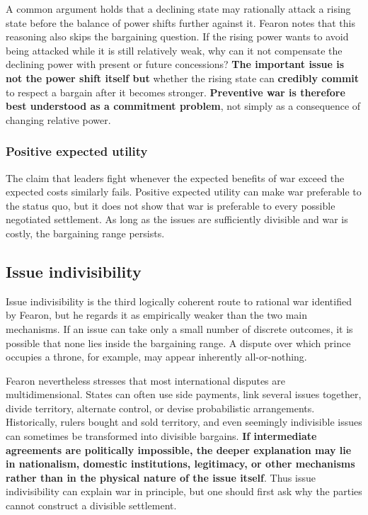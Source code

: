 A common argument holds that a declining state may rationally attack a rising state before the balance of power shifts further against it. Fearon notes that this reasoning also skips the bargaining question. If the rising power wants to avoid being attacked while it is still relatively weak, why can it not compensate the declining power with present or future concessions? \textbf{The important issue is not the power shift itself but} whether the rising state can \textbf{credibly commit} to respect a bargain after it becomes stronger. \textbf{Preventive war is therefore best understood as a commitment problem}, not simply as a consequence of changing relative power.

\subsubsection{Positive expected utility}

The claim that leaders fight whenever the expected benefits of war exceed the expected costs similarly fails. Positive expected utility can make war preferable to the status quo, but it does not show that war is preferable to every possible negotiated settlement. As long as the issues are sufficiently divisible and war is costly, the bargaining range persists.

\subsection{Issue indivisibility}

Issue indivisibility is the third logically coherent route to rational war identified by Fearon, but he regards it as empirically weaker than the two main mechanisms. If an issue can take only a small number of discrete outcomes, it is possible that none lies inside the bargaining range. A dispute over which prince occupies a throne, for example, may appear inherently all-or-nothing.

Fearon nevertheless stresses that most international disputes are multidimensional. States can often use side payments, link several issues together, divide territory, alternate control, or devise probabilistic arrangements. Historically, rulers bought and sold territory, and even seemingly indivisible issues can sometimes be transformed into divisible bargains. \textbf{If intermediate agreements are politically impossible, the deeper explanation may lie in nationalism, domestic institutions, legitimacy, or other mechanisms rather than in the physical nature of the issue itself}. Thus issue indivisibility can explain war in principle, but one should first ask why the parties cannot construct a divisible settlement.

